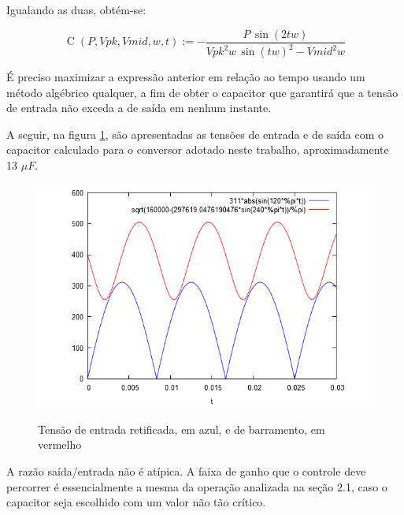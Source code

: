 \documentclass[
        12pt,
        openany, %
        oneside, %
        a4paper,			
        english,			
        brazil
        ]{abntbibufjf}
\begin{document}
Igualando as duas, obtém-se:

\begin{equation}
\operatorname{C}\left( P,\mathit{Vpk},\mathit{Vmid},w,t\right) :=-\frac{P\,\sin{(2tw)}}{{{\mathit{Vpk}}^{2}}w\,{{\sin{(tw)}}^{2}}-{{\mathit{Vmid}}^{2}}w}\mbox{}
\end{equation}

É preciso maximizar a expressão anterior em relação ao tempo usando um método algébrico qualquer, a fim de obter o capacitor que garantirá que a tensão de entrada não exceda a de saída em nenhum instante.


A seguir, na figura \ref{cs5_3}, são apresentadas as tensões de entrada e de saída com o capacitor calculado para o conversor adotado neste trabalho, aproximadamente 13 $\mu F$.

\begin{figure}[!h]
	\centering
	\caption{Tensão de entrada retificada, em azul, e de barramento, em vermelho}
	\includegraphics[width=.95\linewidth,height=.80\textheight,keepaspectratio]{../GRAFICOS/cs5_img/cs5_3}
	\label{cs5_3}
\end{figure}


A razão saída/entrada não é atípica. A faixa de ganho que o controle deve percorrer é essencialmente a mesma da operação analizada na seção 2.1, caso o capacitor seja escolhido com um valor não tão crítico.

\end{document}
